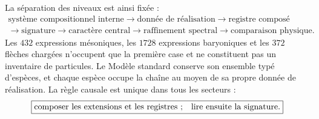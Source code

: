 La séparation des niveaux est ainsi fixée :
\[
\boxed{
\begin{gathered}
\text{système compositionnel interne}
\longrightarrow\text{donnée de réalisation}
\longrightarrow\text{registre composé}\\
\longrightarrow\text{signature}
\longrightarrow\text{caractère central}
\longrightarrow\text{raffinement spectral}
\longrightarrow\text{comparaison physique}.
\end{gathered}}
\]
Les \(432\) expressions mésoniques, les \(1728\) expressions baryoniques et les \(372\) flèches chargées n’occupent que la première case et ne constituent pas un inventaire de particules. Le Modèle standard conserve son ensemble typé d’espèces, et chaque espèce occupe la chaîne au moyen de sa propre donnée de réalisation. La règle causale est unique dans tous les secteurs :
\[
 \boxed{\text{composer les extensions et les registres ;\quad lire ensuite la signature}.}
\]
